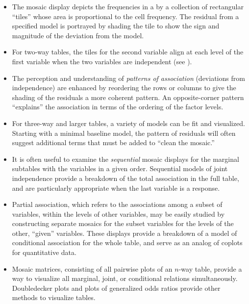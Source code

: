 \begin{itemize}
\item The mosaic display depicts the frequencies in a \ctab{} by a collection of rectangular ``tiles''
whose area is proportional to the cell frequency.
The residual from a specified model is portrayed by shading the tile
to show the sign and magnitude of the deviation from the model.

\item For two-way tables, the tiles for the second variable align
at each level of the first variable when the two variables are independent
(see ).

\item The perception and understanding of \emph{patterns of association}
(deviations from independence) are enhanced by reordering the
rows or columns to give the shading of the residuals a more
coherent pattern.  An opposite-corner pattern ``explains''
the association in terms of the ordering of the factor levels.

\item For three-way and larger tables, a variety of models can be fit
and visualized.
Starting with a minimal baseline model, the pattern of residuals
will often suggest additional terms that must be added to
``clean the mosaic.''

\item It is often useful to examine the \emph{sequential} mosaic
displays for the marginal subtables with the variables in a given order.
Sequential models of joint independence provide a breakdown of the
total association in the full table, and are particularly
appropriate when the last variable is a response.

\item Partial association, which refers to the associations among
a subset of variables, within the levels of other variables,
may be easily studied by constructing separate mosaics for the subset
variables for the levels of the other, ``given'' variables.
These displays provide a breakdown of a model of conditional association
for the whole table, and serve as an analog of coplots for quantitative
data.

\item Mosaic matrices, consisting of all pairwise plots of an $n$-way
table, provide a way to visualize all marginal, joint, or conditional 
relations simultaneously.  
Doubledecker plots and plots of generalized odds ratios provide other
methods to visualize \nway tables.


\end{itemize}
